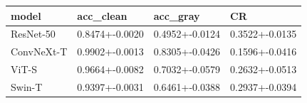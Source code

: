 \begin{tabular}{llll}
\toprule
model & acc_clean & acc_gray & CR \\
\midrule
ResNet-50 & 0.8474+-0.0020 & 0.4952+-0.0124 & 0.3522+-0.0135 \\
ConvNeXt-T & 0.9902+-0.0013 & 0.8305+-0.0426 & 0.1596+-0.0416 \\
ViT-S & 0.9664+-0.0082 & 0.7032+-0.0579 & 0.2632+-0.0513 \\
Swin-T & 0.9397+-0.0031 & 0.6461+-0.0388 & 0.2937+-0.0394 \\
\bottomrule
\end{tabular}
